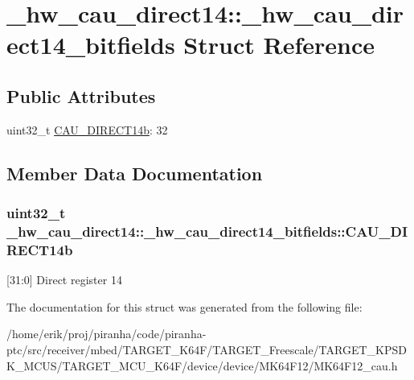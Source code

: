 \hypertarget{struct__hw__cau__direct14_1_1__hw__cau__direct14__bitfields}{}\section{\+\_\+hw\+\_\+cau\+\_\+direct14\+:\+:\+\_\+hw\+\_\+cau\+\_\+direct14\+\_\+bitfields Struct Reference}
\label{struct__hw__cau__direct14_1_1__hw__cau__direct14__bitfields}
\subsection*{Public Attributes}
\begin{DoxyCompactItemize}
\item 
uint32\+\_\+t \hyperlink{struct__hw__cau__direct14_1_1__hw__cau__direct14__bitfields_ad0fe7ced97a35e52ebf147fcf633e110}{C\+A\+U\+\_\+\+D\+I\+R\+E\+C\+T14b}\+: 32
\end{DoxyCompactItemize}


\subsection{Member Data Documentation}
\subsubsection[{\texorpdfstring{C\+A\+U\+\_\+\+D\+I\+R\+E\+C\+T14b}{CAU_DIRECT14b}}]{\setlength{\rightskip}{0pt plus 5cm}uint32\+\_\+t \+\_\+hw\+\_\+cau\+\_\+direct14\+::\+\_\+hw\+\_\+cau\+\_\+direct14\+\_\+bitfields\+::\+C\+A\+U\+\_\+\+D\+I\+R\+E\+C\+T14b}\hypertarget{struct__hw__cau__direct14_1_1__hw__cau__direct14__bitfields_ad0fe7ced97a35e52ebf147fcf633e110}{}\label{struct__hw__cau__direct14_1_1__hw__cau__direct14__bitfields_ad0fe7ced97a35e52ebf147fcf633e110}
\mbox{[}31\+:0\mbox{]} Direct register 14 

The documentation for this struct was generated from the following file\+:\begin{DoxyCompactItemize}
\item 
/home/erik/proj/piranha/code/piranha-\/ptc/src/receiver/mbed/\+T\+A\+R\+G\+E\+T\+\_\+\+K64\+F/\+T\+A\+R\+G\+E\+T\+\_\+\+Freescale/\+T\+A\+R\+G\+E\+T\+\_\+\+K\+P\+S\+D\+K\+\_\+\+M\+C\+U\+S/\+T\+A\+R\+G\+E\+T\+\_\+\+M\+C\+U\+\_\+\+K64\+F/device/device/\+M\+K64\+F12/M\+K64\+F12\+\_\+cau.\+h\end{DoxyCompactItemize}
